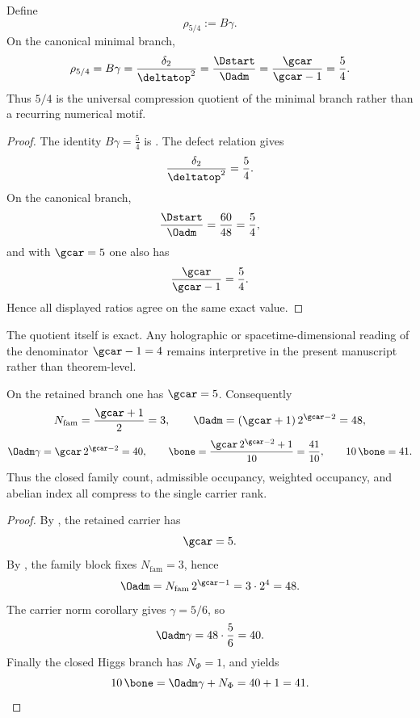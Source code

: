 \begin{lemma}
\label{lem:universal-5-4-compression}
Define
\[
\rho_{5/4}:=B\gamma.
\]
On the canonical minimal branch,
\[
\rho_{5/4}
=
B\gamma
=
\frac{\delta_2}{\deltatop^2}
=
\frac{\Dstart}{\Oadm}
=
\frac{\gcar}{\gcar-1}
=
\frac54.
\]
Thus $5/4$ is the universal compression quotient of the minimal branch rather than a recurring numerical motif.
\end{lemma}

\begin{proof}
The identity $B\gamma=\frac54$ is . The defect relation gives
\[
\frac{\delta_2}{\deltatop^2}=\frac54.
\]
On the canonical branch,
\[
\frac{\Dstart}{\Oadm}=\frac{60}{48}=\frac54,
\]
and with $\gcar=5$ one also has
\[
\frac{\gcar}{\gcar-1}=\frac{5}{4}.
\]
Hence all displayed ratios agree on the same exact value.
\end{proof}

\begin{remark}
The quotient itself is exact. Any holographic or spacetime-dimensional reading of the denominator $\gcar-1=4$ remains interpretive in the present manuscript rather than theorem-level.
\end{remark}

\begin{corollary}
\label{cor:rank-5-master-compression}
On the retained branch one has $\gcar=5$. Consequently
\[
N_{\mathrm{fam}}=\frac{\gcar+1}{2}=3,
\qquad
\Oadm=(\gcar+1)\,2^{\gcar-2}=48,
\]
\[
\Oadm\gamma=\gcar\,2^{\gcar-2}=40,
\qquad
\bone=\frac{\gcar\,2^{\gcar-2}+1}{10}=\frac{41}{10},
\qquad
10\,\bone=41.
\]
Thus the closed family count, admissible occupancy, weighted occupancy, and abelian index all
compress to the single carrier rank.
\end{corollary}

\begin{proof}
By , the retained carrier has
\[
\gcar=5.
\]
By , the family block fixes $N_{\mathrm{fam}}=3$, hence
\[
\Oadm=N_{\mathrm{fam}}\,2^{\gcar-1}=3\cdot 2^4=48.
\]
The carrier norm corollary gives $\gamma=5/6$, so
\[
\Oadm\gamma=48\cdot\frac56=40.
\]
Finally the closed Higgs branch has $N_\Phi=1$, and  yields
\[
10\,\bone=\Oadm\gamma+N_\Phi=40+1=41.
\]
\end{proof}

